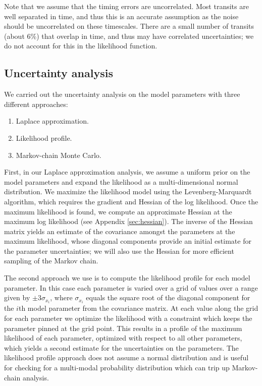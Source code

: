 \documentclass[fleqn,usenatbib]{mnras} %
\begin{document}
Note that we assume that the timing errors are uncorrelated.  Most transits
are well separated in time, and thus this is an accurate assumption as the noise
should be uncorrelated on these timescales.  There are a small number of transits
(about 6\%) that overlap in time, and thus may have correlated uncertainties; we do not account for this in the likelihood function.

\subsection{Uncertainty analysis}

We carried out the uncertainty analysis on the model parameters with
three different approaches:

\begin{enumerate}
    \item Laplace approximation.
    \item Likelihood profile.
    \item Markov-chain Monte Carlo.
\end{enumerate}

First, in our Laplace approximation analysis, we assume a uniform prior on the model parameters and  expand the likelihood as a multi-dimensional normal distribution. %
We maximize the likelihood model using
the Levenberg-Marquardt algorithm, which requires the gradient and Hessian
of the log likelihood.  Once the maximum likelihood is found, we compute an approximate Hessian at the maximum log likelihood (see Appendix \ref{sec:hessian}). The inverse of the Hessian matrix yields an estimate of the covariance amongst the
parameters at the maximum likelihood, whose diagonal components
provide an initial estimate for the parameter uncertainties; we will also use the Hessian for more efficient sampling of the
Markov chain.

The second approach we use is to compute the likelihood
profile for each model parameter.  In this case each parameter
is varied over a grid of values over a range given
by $\pm 3 \sigma_{x_i}$, where $\sigma_{x_i}$ equals the
square root of the diagonal component for the $i$th model
parameter from the covariance matrix.  At each value along
the grid for each parameter we optimize the likelihood with
a constraint which keeps the parameter pinned at the grid
point.  This results in a profile of the maximum likelihood of
each parameter, optimized with respect to all other parameters, which yields
a second estimate for the uncertainties on the parameters.
The likelihood profile approach does not assume a normal distribution and is useful for checking for 
a multi-modal probability distribution which can trip up Markov-chain analysis.
\end{document}
